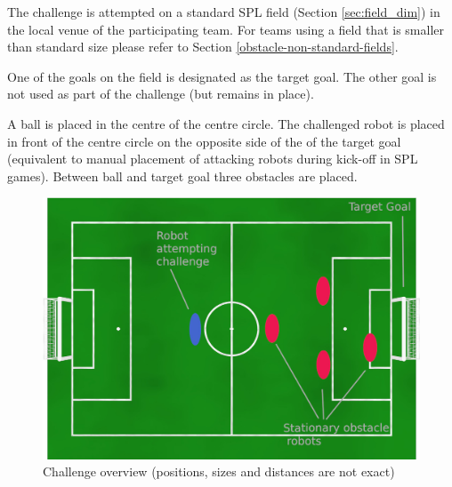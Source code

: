 The challenge is attempted on a standard SPL field (\cf Section \ref{sec:field_dim}) in the local venue of the participating team. For teams using a field that is smaller than standard size please refer to Section \ref{obstacle-non-standard-fields}.

One of the goals on the field is designated as the target goal. The other goal is not used as part of the challenge (but remains in place).

A ball is placed in the centre of the centre circle. The challenged robot is placed in front of the centre circle on the opposite side of the of the target goal (equivalent to manual placement of attacking robots during kick-off in SPL games). Between ball and target goal three obstacles are placed.

\begin{figure}[ht]
	\centering
	\includegraphics[width=1.0\textwidth]{figs/obstacle_challenge_2021.jpeg}
	\caption{Challenge overview (positions, sizes and distances are not exact)}
\end{figure}

